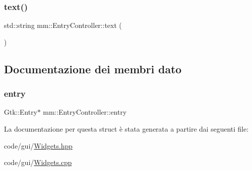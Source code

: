 \mbox{\label{structmm_1_1_entry_controller_a8665e8b7d74b0f8c807d5b3ad418e535}} 
\subsubsection{\texorpdfstring{text()}{text()}}
{\footnotesize\ttfamily std\+::string mm\+::\+Entry\+Controller\+::text (\begin{DoxyParamCaption}{ }\end{DoxyParamCaption})\hspace{0.3cm}{\ttfamily [inline]}}



\subsection{Documentazione dei membri dato}
\mbox{\label{structmm_1_1_entry_controller_ab41f377d1a98b2bf967c81dc1dc7f391}} 
\subsubsection{\texorpdfstring{entry}{entry}}
{\footnotesize\ttfamily Gtk\+::\+Entry$\ast$ mm\+::\+Entry\+Controller\+::entry}



La documentazione per questa struct è stata generata a partire dai seguenti file\+:\begin{DoxyCompactItemize}
\item 
code/gui/\hyperlink{_widgets_8hpp}{Widgets.\+hpp}\item 
code/gui/\hyperlink{_widgets_8cpp}{Widgets.\+cpp}\end{DoxyCompactItemize}
